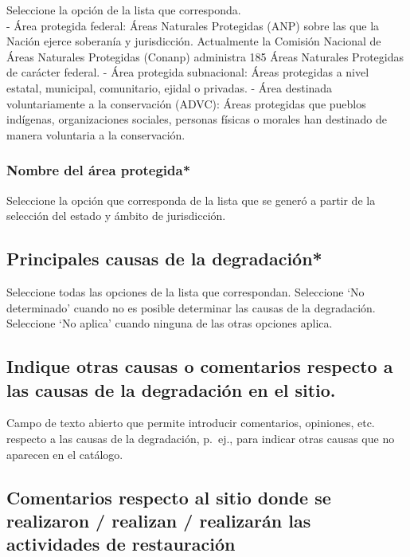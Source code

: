 \documentclass[
]{book}
\begin{document}
Seleccione la opción de la lista que corresponda.\\
- Área protegida federal: Áreas Naturales Protegidas (ANP) sobre las que la Nación ejerce soberanía y jurisdicción. Actualmente la Comisión Nacional de Áreas Naturales Protegidas (Conanp) administra 185 Áreas Naturales Protegidas de carácter federal.
- Área protegida subnacional: Áreas protegidas a nivel estatal, municipal, comunitario, ejidal o privadas.
- Área destinada voluntariamente a la conservación (ADVC): Áreas protegidas que pueblos indígenas, organizaciones sociales, personas físicas o morales han destinado de manera voluntaria a la conservación.

\hypertarget{nombre-del-uxe1rea-protegida}{%
\subsubsection{Nombre del área protegida*}\label{nombre-del-uxe1rea-protegida}}

Seleccione la opción que corresponda de la lista que se generó a partir de la selección del estado y ámbito de jurisdicción.

\hypertarget{principales-causas-de-la-degradaciuxf3n}{%
\subsection{Principales causas de la degradación*}\label{principales-causas-de-la-degradaciuxf3n}}

Seleccione todas las opciones de la lista que correspondan.
Seleccione `No determinado' cuando no es posible determinar las causas de la degradación.
Seleccione `No aplica' cuando ninguna de las otras opciones aplica.

\hypertarget{indique-otras-causas-o-comentarios-respecto-a-las-causas-de-la-degradaciuxf3n-en-el-sitio.}{%
\subsection{Indique otras causas o comentarios respecto a las causas de la degradación en el sitio.}\label{indique-otras-causas-o-comentarios-respecto-a-las-causas-de-la-degradaciuxf3n-en-el-sitio.}}

Campo de texto abierto que permite introducir comentarios, opiniones, etc. respecto a las causas de la degradación, p.~ej., para indicar otras causas que no aparecen en el catálogo.

\hypertarget{comentarios-respecto-al-sitio-donde-se-realizaron-realizan-realizaruxe1n-las-actividades-de-restauraciuxf3n}{%
\subsection{Comentarios respecto al sitio donde se realizaron / realizan / realizarán las actividades de restauración}\label{comentarios-respecto-al-sitio-donde-se-realizaron-realizan-realizaruxe1n-las-actividades-de-restauraciuxf3n}}
\end{document}
